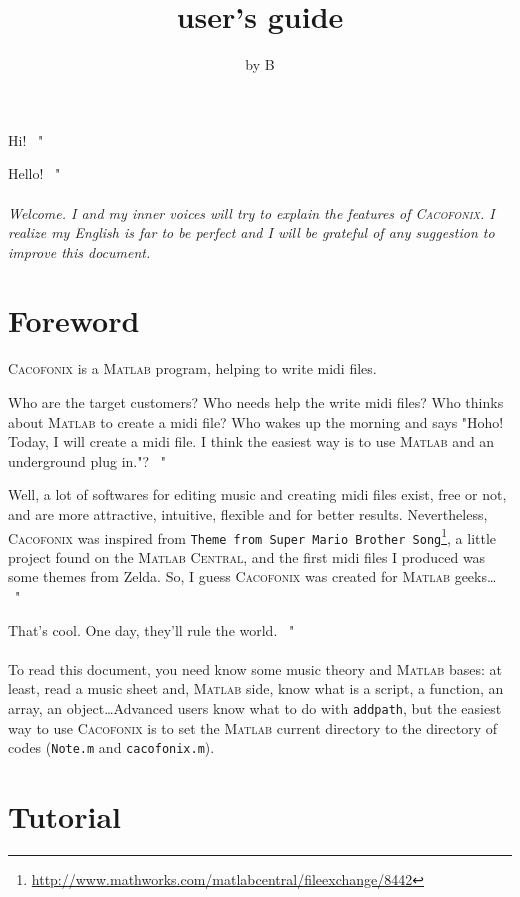 \documentclass{article}
\title{\cacofonix user's guide}
\author{by B}
\date{}
\newcommand\cacofonix{\textsc{Cacofonix}\xspace}
\newcommand\matlab{\textsc{Matlab}\xspace}
\newcommand\noteFile{\texttt{Note.m}\xspace}
\newcommand\cacofonixFile{\texttt{cacofonix.m}\xspace}
\newcommand\exchange[2]{\texttt{#1}\footnote{\url{#2}}\xspace}
\newenvironment{meenv}{ \par \noindent \makebox[6em][r]{ \textcolor{mecolor}{Me}: " --~}}{~"}
\newenvironment{myselfenv}{ \par \noindent \makebox[6em][r]{ \textcolor{myselfcolor}{Myself}: " --~}}{~"}
\newcommand{ \me }[1]{%
\begin{meenv}%
	#1%
\end{meenv} }
\newcommand{ \myself }[1]{%
\begin{myselfenv}%
	#1%
\end{myselfenv} }
\begin{document}
\maketitle

\me{Hi!}
\myself{Hello!}

\paragraph{}

\emph{Welcome. I and my inner voices will try to explain the features of \cacofonix. I realize my English is far to be perfect and I will be grateful of any suggestion to improve this document.}

\tableofcontents

\section{Foreword}

\cacofonix is a \matlab program, helping to write midi files.

\me{Who are the target customers? Who needs help the write midi files? Who thinks about \matlab to create a midi file? Who wakes up the morning and says "Hoho! Today, I will create a midi file. I think the easiest way is to use \matlab and an underground plug in."?}
\myself{Well, a lot of softwares for editing music and creating midi files exist, free or not, and are more attractive, intuitive, flexible and for better results. Nevertheless, \cacofonix was inspired from \exchange{Theme from Super Mario Brother Song}{http://www.mathworks.com/matlabcentral/fileexchange/8442}, a little project found on the \textsc{Matlab Central}, and the first midi files I produced was some themes from Zelda. So, I guess \cacofonix was created for \matlab geeks\dots}
\me{That's cool. One day, they'll rule the world.}

\paragraph{}

To read this document, you need know some music theory and \matlab bases: at least, read a music sheet and, \matlab side, know what is a script, a function, an array, an object\dots Advanced users know what to do with \lstinline!addpath!, but the easiest way to use \cacofonix is to set the \matlab current directory to the directory of codes (\noteFile and \cacofonixFile).

\section{Tutorial}
\end{document}
